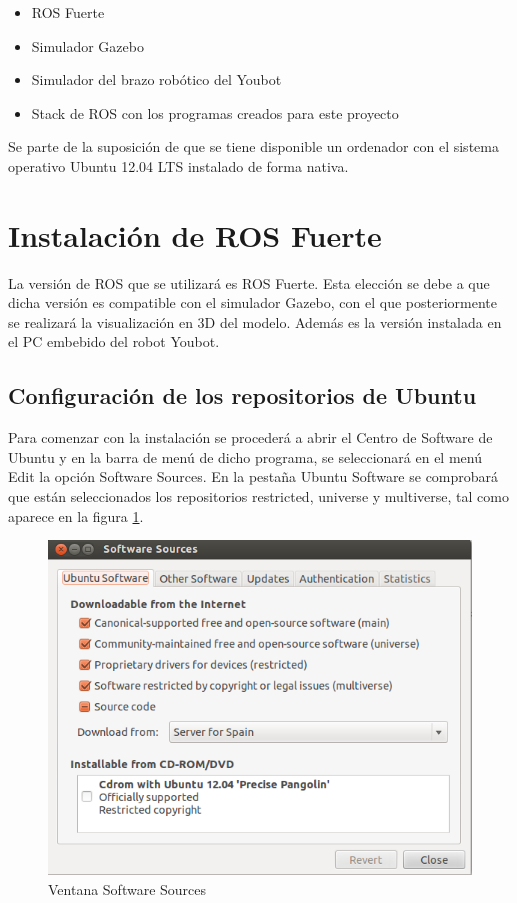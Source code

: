 \documentclass[12pt, a4paper]{report}
\begin{document}
\begin{itemize}
\item{ROS Fuerte}
\item{Simulador Gazebo}
\item{Simulador del brazo robótico del Youbot}
\item{Stack de ROS con los programas creados para este proyecto}
\end{itemize}

Se parte de la suposición de que se tiene disponible un ordenador con el sistema operativo Ubuntu 12.04 LTS instalado de forma nativa.

\section{Instalación de ROS Fuerte}

La versión de ROS que se utilizará es ROS Fuerte. Esta elección se debe a que dicha versión es compatible con el simulador Gazebo, con el que posteriormente se realizará la visualización en 3D del modelo. Además es la versión instalada en el PC embebido del robot Youbot.\\

\subsection{Configuración de los repositorios de Ubuntu}

Para comenzar con la instalación se procederá a abrir el Centro de Software de Ubuntu y en la barra de menú de dicho programa, se seleccionará en el menú Edit la opción Software Sources. En la pestaña Ubuntu Software se comprobará que están seleccionados los repositorios restricted, universe y multiverse, tal como aparece en la figura \ref{fig: software_sources}.\\

\begin{figure}[h]
	\centering
		\includegraphics[scale=0.4]{../img/software_sources.png} 
	\caption[Ventana Software Sources]{Ventana Software Sources} 
	\label{fig: software_sources}
\end{figure}
\end{document}

